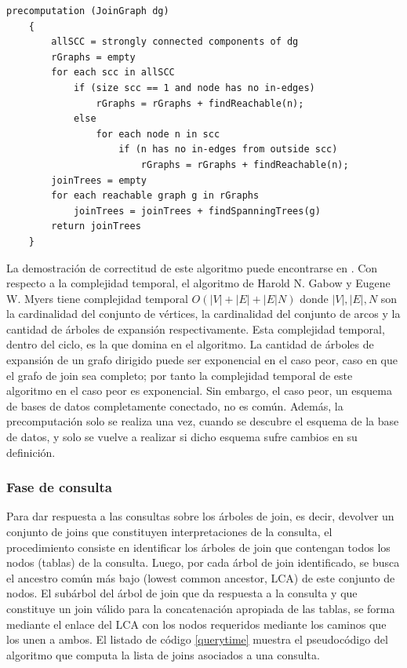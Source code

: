 \begin{lstlisting}[label={precom}, caption={Pseudoc\'odigo del proceso de precomputaci\'on (tomado de \cite{mason2005autojoin})}]
    precomputation (JoinGraph dg)
    {
        allSCC = strongly connected components of dg
        rGraphs = empty
        for each scc in allSCC
            if (size scc == 1 and node has no in-edges)
                rGraphs = rGraphs + findReachable(n);
            else
                for each node n in scc
                    if (n has no in-edges from outside scc)
                        rGraphs = rGraphs + findReachable(n);
        joinTrees = empty
        for each reachable graph g in rGraphs
            joinTrees = joinTrees + findSpanningTrees(g)
        return joinTrees
    }
\end{lstlisting}

La demostración de correctitud de este algoritmo puede encontrarse en 
\cite{mason2005autojoin}. Con respecto a la complejidad temporal, el algoritmo de Harold N. Gabow y 
Eugene W. Myers tiene complejidad temporal $O(|V| + |E| + |E|N)$ donde $|V|, |E|, N$ son la cardinalidad 
del conjunto de vértices, la cardinalidad del conjunto de arcos y la cantidad de \'arboles de expansión respectivamente. 
Esta complejidad temporal, dentro del ciclo, es la que domina en el algoritmo. La cantidad de \'arboles de 
expansión de un grafo dirigido puede ser exponencial en el caso peor, caso en que el grafo de join sea 
completo; por tanto la complejidad temporal de este algoritmo en el caso peor es exponencial. Sin embargo, 
el caso peor, un esquema de bases de datos completamente conectado, no es com\'un. Además, la precomputaci\'on 
solo se realiza una vez, 
cuando se descubre el esquema de la base de datos, y solo se vuelve a realizar si dicho 
esquema sufre cambios en su definición.

\subsubsection{Fase de consulta}

Para dar respuesta a las consultas sobre los \'arboles de join, es decir, devolver un conjunto de joins que constituyen 
interpretaciones de la consulta, el procedimiento consiste en identificar los \'arboles de join que 
contengan todos los nodos (tablas) de la consulta. Luego, por cada \'arbol de join identificado, 
se busca el ancestro com\'un m\'as bajo (lowest common ancestor, LCA) de este conjunto de nodos. 
El sub\'arbol del \'arbol de join que da respuesta a la consulta y que constituye un join válido 
para la concatenación apropiada de las tablas, se forma mediante el enlace del LCA con los nodos requeridos 
mediante los caminos que los unen a ambos. El listado de código \ref{querytime} muestra el pseudoc\'odigo 
del algoritmo que computa la lista de joins asociados a una consulta.

